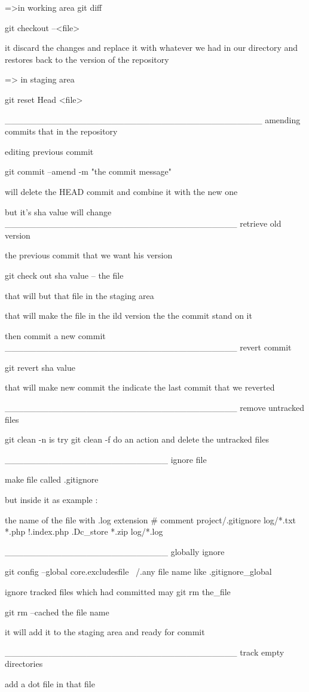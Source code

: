 =>in working area 
git diff  

git checkout --<file>

it discard the changes 
and replace it with whatever we had in our directory
and restores back to the version of the repository 

=> in staging area 

git reset Head <file> 

_________________________________________ 
amending commits that in the repository 

editing previous commit 

git commit --amend -m "the commit message" 

will delete the HEAD commit and combine it with the new one 

but it's sha value will change 
_____________________________________
retrieve old version 


the previous commit  that we want his version 

git check out sha value  --  the file 

that will but that file in the staging area

that will make the file in the ild version the the commit stand on it 

then commit a new commit 
_____________________________________
revert commit 


git revert sha value 

that will make new commit the indicate the last commit that we reverted 

_____________________________________
                 remove untracked files 

git clean -n 
is try 
git clean -f 
do an action and delete the untracked files 

__________________________
                      ignore file

make file called .gitignore 

but inside it  as example :

the name of the file with .log extension
# comment 
project/.gitignore
log/*.txt
*.php 
!.index.php 
.Dc_store 
*.zip
log/*.log 


__________________________
globally ignore 

git config --global core.excludesfile ~/.any file name like  .gitignore_global


ignore tracked files which had committed
may 
git rm the_file 

git rm --cached the file name 

it will add it to the staging area 
and ready for commit 

_____________________________________
track empty directories 

add  a dot file in that file 


